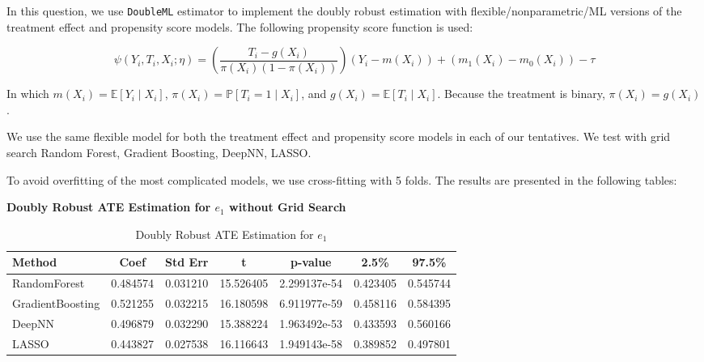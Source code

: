 \documentclass{article}
\begin{document}
In this question, we use \texttt{DoubleML} estimator to implement the doubly robust estimation with flexible/nonparametric/ML versions of the treatment effect and propensity score models. The following propensity score function is used:

$$
\psi(Y_i, T_i, X_i; \eta) = \left( \frac{T_i - g(X_i)}{\pi(X_i)(1 - \pi(X_i))} \right) (Y_i - m(X_i)) + \left( m_1(X_i) - m_0(X_i) \right) - \tau
$$

In which $m(X_i) = \mathbb{E}[Y_i \mid X_i]$, $\pi(X_i) = \mathbb{P}[T_i = 1 \mid X_i]$, and $g(X_i) = \mathbb{E}[T_i \mid X_i]$. Because the treatment is binary, $\pi(X_i) = g(X_i)$.

We use the same flexible model for both the treatment effect and propensity score models in each of our tentatives. We test with grid search Random Forest, Gradient Boosting, DeepNN, LASSO.

To avoid overfitting of the most complicated models, we use cross-fitting with 5 folds. The results are presented in the following tables:


\begin{table}[H]
  \textbf{Doubly Robust ATE Estimation for $e_1$ without Grid Search}
  \centering
  \renewcommand{\arraystretch}{1.5}
  \begin{tabular}{|l|c|c|c|c|c|c|}
    \hline
    \textbf{Method} & \textbf{Coef} & \textbf{Std Err} & \textbf{t} & \textbf{p-value} & \textbf{2.5\%} & \textbf{97.5\%} \\
    \hline
    RandomForest & 0.484574 & 0.031210 & 15.526405 & 2.299137e-54 & 0.423405 & 0.545744 \\ \hline
    GradientBoosting & 0.521255 & 0.032215 & 16.180598 & 6.911977e-59 & 0.458116 & 0.584395 \\ \hline
    DeepNN & 0.496879 & 0.032290 & 15.388224 & 1.963492e-53 & 0.433593 & 0.560166 \\ \hline
    LASSO & 0.443827 & 0.027538 & 16.116643 & 1.949143e-58 & 0.389852 & 0.497801 \\ \hline
  \end{tabular}
  \caption{Doubly Robust ATE Estimation for $e_1$}
\end{table}
\end{document}
